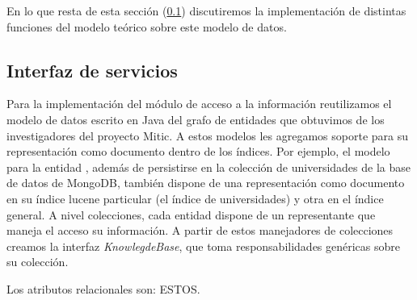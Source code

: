 En lo que resta de esta sección (\ref{subsec:modelos-db}) discutiremos la implementación de distintas funciones del modelo teórico sobre este modelo de datos.








\subsection{Interfaz de servicios}
\label{subsec:modelos-db}

Para la implementación del módulo de acceso a la información reutilizamos el modelo de datos escrito en Java del grafo de entidades que obtuvimos de los investigadores del proyecto Mitic. A estos modelos les agregamos soporte para su representación como documento dentro de los índices. Por ejemplo, el modelo para la entidad , además de persistirse en la colección de universidades de la base de datos de MongoDB, también dispone de una representación como documento en su índice lucene particular (el índice de universidades) y otra en el índice general. A nivel colecciones, cada entidad dispone de un representante que maneja el acceso su información. A partir de estos manejadores de colecciones creamos la interfaz \emph{KnowlegdeBase}, que toma responsabilidades genéricas sobre su colección.

Los atributos relacionales son: {\color{red}ESTOS}. %

